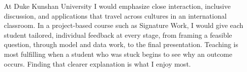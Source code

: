\documentclass[11pt]{article}
\begin{document}
At Duke Kunshan University I would emphasize close interaction, inclusive discussion, and applications that travel across cultures in an international classroom. In a project-based course such as Signature Work, I would give each student tailored, individual feedback at every stage, from framing a feasible question, through model and data work, to the final presentation. Teaching is most fulfilling when a student who was stuck begins to see why an outcome occurs. Finding that clearer explanation is what I enjoy most.
\end{document}
